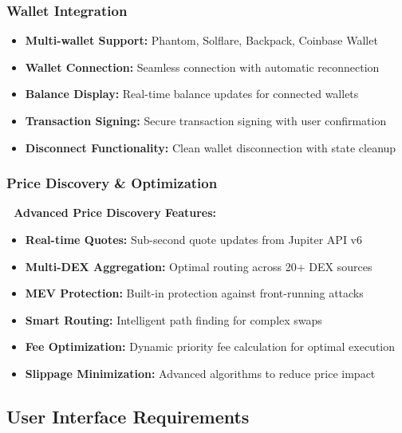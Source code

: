 \documentclass[12pt,a4paper]{article}
\begin{document}
\subsubsection{Wallet Integration}

\begin{itemize}
    \item \textbf{Multi-wallet Support:} Phantom, Solflare, Backpack, Coinbase Wallet
    \item \textbf{Wallet Connection:} Seamless connection with automatic reconnection
    \item \textbf{Balance Display:} Real-time balance updates for connected wallets
    \item \textbf{Transaction Signing:} Secure transaction signing with user confirmation
    \item \textbf{Disconnect Functionality:} Clean wallet disconnection with state cleanup
\end{itemize}

\subsubsection{Price Discovery \& Optimization}

\begin{tcolorbox}[colback=successGreen!10,colframe=successGreen]
\textbf{🎯 Advanced Price Discovery Features:}
\begin{itemize}
    \item \textbf{Real-time Quotes:} Sub-second quote updates from Jupiter API v6
    \item \textbf{Multi-DEX Aggregation:} Optimal routing across 20+ DEX sources
    \item \textbf{MEV Protection:} Built-in protection against front-running attacks
    \item \textbf{Smart Routing:} Intelligent path finding for complex swaps
    \item \textbf{Fee Optimization:} Dynamic priority fee calculation for optimal execution
    \item \textbf{Slippage Minimization:} Advanced algorithms to reduce price impact
\end{itemize}
\end{tcolorbox}

\subsection{User Interface Requirements}
\end{document}

